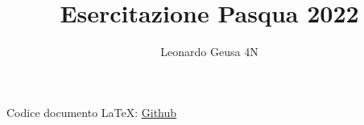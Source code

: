 \documentclass[12pt]{article}
\begin{document}
\title{Esercitazione Pasqua 2022}
\date{}
\author{Leonardo Geusa 4N}
\setcounter{section}{-1}
\maketitle


\newpage
\vspace*{3cm}
\tableofcontents



\raggedright

























\vspace*{\fill}
Codice documento LaTeX: \href{https://github.com/Leoooog/Esercitazione-Pasqua}{Github}
\end{document}
